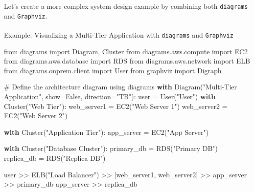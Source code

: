 \documentclass[
  letterpaper,
  DIV=11,
  numbers=noendperiod]{scrreprt}
\makeatletter
\let\oldparagraph\paragraph
\renewcommand{\paragraph}{
    \@ifstar
      \xxxParagraphStar
      \xxxParagraphNoStar
  }
\newcommand{\xxxParagraphStar}[1]{\oldparagraph*{#1}\mbox{}}
\newcommand{\xxxParagraphNoStar}[1]{\oldparagraph{#1}\mbox{}}
\newenvironment{Shaded}{\begin{snugshade}}{\end{snugshade}}
\newcommand{\CommentTok}[1]{\textcolor[rgb]{0.37,0.37,0.37}{#1}}
\newcommand{\ControlFlowTok}[1]{\textcolor[rgb]{0.00,0.23,0.31}{\textbf{#1}}}
\newcommand{\ImportTok}[1]{\textcolor[rgb]{0.00,0.46,0.62}{#1}}
\newcommand{\NormalTok}[1]{\textcolor[rgb]{0.00,0.23,0.31}{#1}}
\newcommand{\OperatorTok}[1]{\textcolor[rgb]{0.37,0.37,0.37}{#1}}
\newcommand{\StringTok}[1]{\textcolor[rgb]{0.13,0.47,0.30}{#1}}
\newcommand{\VariableTok}[1]{\textcolor[rgb]{0.07,0.07,0.07}{#1}}
\makeatother
\begin{document}
Let's create a more complex system design example by combining both
\texttt{diagrams} and \texttt{Graphviz}.

\paragraph{\texorpdfstring{Example: Visualizing a Multi-Tier Application
with \texttt{diagrams} and
\texttt{Graphviz}}{Example: Visualizing a Multi-Tier Application with diagrams and Graphviz}}\label{example-visualizing-a-multi-tier-application-with-diagrams-and-graphviz}

\begin{Shaded}
\begin{Highlighting}[]
\ImportTok{from}\NormalTok{ diagrams }\ImportTok{import}\NormalTok{ Diagram, Cluster}
\ImportTok{from}\NormalTok{ diagrams.aws.compute }\ImportTok{import}\NormalTok{ EC2}
\ImportTok{from}\NormalTok{ diagrams.aws.database }\ImportTok{import}\NormalTok{ RDS}
\ImportTok{from}\NormalTok{ diagrams.aws.network }\ImportTok{import}\NormalTok{ ELB}
\ImportTok{from}\NormalTok{ diagrams.onprem.client }\ImportTok{import}\NormalTok{ User}
\ImportTok{from}\NormalTok{ graphviz }\ImportTok{import}\NormalTok{ Digraph}

\CommentTok{\# Define the architecture diagram using \textasciigrave{}diagrams\textasciigrave{}}
\ControlFlowTok{with}\NormalTok{ Diagram(}\StringTok{"Multi{-}Tier Application"}\NormalTok{, show}\OperatorTok{=}\VariableTok{False}\NormalTok{, direction}\OperatorTok{=}\StringTok{"TB"}\NormalTok{):}
\NormalTok{    user }\OperatorTok{=}\NormalTok{ User(}\StringTok{"User"}\NormalTok{)}
    \ControlFlowTok{with}\NormalTok{ Cluster(}\StringTok{"Web Tier"}\NormalTok{):}
\NormalTok{        web\_server1 }\OperatorTok{=}\NormalTok{ EC2(}\StringTok{"Web Server 1"}\NormalTok{)}
\NormalTok{        web\_server2 }\OperatorTok{=}\NormalTok{ EC2(}\StringTok{"Web Server 2"}\NormalTok{)}

    \ControlFlowTok{with}\NormalTok{ Cluster(}\StringTok{"Application Tier"}\NormalTok{):}
\NormalTok{        app\_server }\OperatorTok{=}\NormalTok{ EC2(}\StringTok{"App Server"}\NormalTok{)}

    \ControlFlowTok{with}\NormalTok{ Cluster(}\StringTok{"Database Cluster"}\NormalTok{):}
\NormalTok{        primary\_db }\OperatorTok{=}\NormalTok{ RDS(}\StringTok{"Primary DB"}\NormalTok{)}
\NormalTok{        replica\_db }\OperatorTok{=}\NormalTok{ RDS(}\StringTok{"Replica DB"}\NormalTok{)}

\NormalTok{    user }\OperatorTok{\textgreater{}\textgreater{}}\NormalTok{ ELB(}\StringTok{"Load Balancer"}\NormalTok{) }\OperatorTok{\textgreater{}\textgreater{}}\NormalTok{ [web\_server1, web\_server2] }\OperatorTok{\textgreater{}\textgreater{}}\NormalTok{ app\_server }\OperatorTok{\textgreater{}\textgreater{}}\NormalTok{ primary\_db}
\NormalTok{    app\_server }\OperatorTok{\textgreater{}\textgreater{}}\NormalTok{ replica\_db}


\end{Highlighting}
\end{Shaded}
\end{document}
